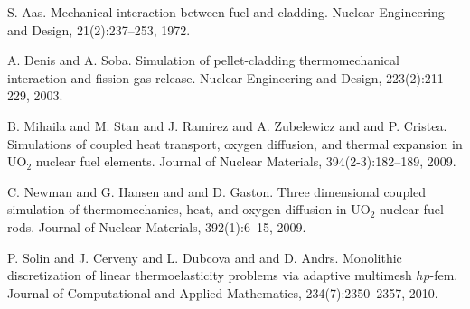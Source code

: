 
\begin{thebibliography}{10}

{\sc S. Aas}. {Mechanical interaction between fuel and cladding}. Nuclear Engineering and Design, 21(2):237--253, 1972.



{\sc A. Denis and A. Soba}. {Simulation of pellet-cladding thermomechanical interaction and fission gas release}. Nuclear Engineering and Design, 223(2):211--229, 2003.



{\sc B. Mihaila and M. Stan and J. Ramirez and A. Zubelewicz and and P. Cristea}. {Simulations of coupled heat transport, oxygen diffusion, and thermal expansion in UO$_2$ nuclear fuel elements}. Journal of Nuclear Materials, 394(2-3):182--189, 2009.



{\sc C. Newman and G. Hansen and and D. Gaston}. {Three dimensional coupled simulation of thermomechanics, heat, and oxygen diffusion in UO$_2$ nuclear fuel rods}. Journal of Nuclear Materials, 392(1):6--15, 2009.



{\sc P. Solin and J. Cerveny and L. Dubcova and and D. Andrs}. {Monolithic discretization of linear thermoelasticity problems via adaptive multimesh $hp$-fem}. Journal of Computational and Applied Mathematics, 234(7):2350--2357, 2010.


\end{thebibliography}
